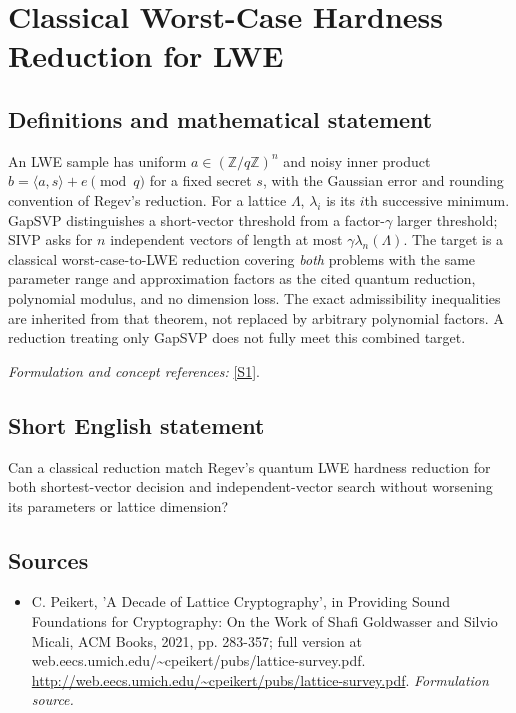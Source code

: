 \documentclass[11pt]{article}
\begin{document}
\section*{\texorpdfstring{Classical Worst-Case Hardness Reduction for LWE}{Classical Worst-Case Hardness Reduction for LWE}}\label{264}
\subsection{Definitions and mathematical statement}
An LWE sample has uniform $a\in({\mathbb{Z}}/q{\mathbb{Z}})^n$ and noisy inner product
$b=\langle a,s\rangle+e\pmod q$ for a fixed secret $s$, with the Gaussian error and rounding convention of Regev's reduction. For a lattice $\Lambda$, $\lambda_i$ is its $i$th successive minimum. GapSVP distinguishes a short-vector threshold from a factor-$\gamma$ larger threshold; SIVP asks for $n$ independent vectors of length at most $\gamma\lambda_n(\Lambda)$. The target is a classical worst-case-to-LWE reduction covering \emph{both} problems with the same parameter range and approximation factors as the cited quantum reduction, polynomial modulus, and no dimension loss. The exact admissibility inequalities are inherited from that theorem, not replaced by arbitrary polynomial factors. A reduction treating only GapSVP does not fully meet this combined target.
\par\smallskip\textit{Formulation and concept references:} \href{http://web.eecs.umich.edu/~cpeikert/pubs/lattice-survey.pdf}{[S1]}.

\subsection{Short English statement}
Can a classical reduction match Regev's quantum LWE hardness reduction for both shortest-vector decision and independent-vector search without worsening its parameters or lattice dimension?
\subsection{Sources}
\begin{itemize}
\item[S1]C. Peikert, 'A Decade of Lattice Cryptography', in Providing Sound Foundations for Cryptography: On the Work of Shafi Goldwasser and Silvio Micali, ACM Books, 2021, pp. 283-357; full version at web.eecs.umich.edu/\textasciitilde{}cpeikert/pubs/lattice-survey.pdf.
\url{http://web.eecs.umich.edu/~cpeikert/pubs/lattice-survey.pdf}.
\textit{Formulation source.}
\end{itemize}
\end{document}
